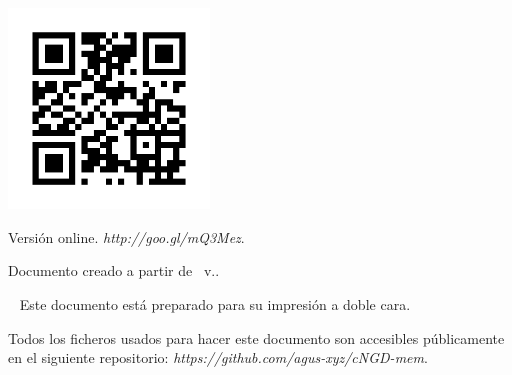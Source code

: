 
\newpage
\thispagestyle{empty}
\mbox{ }

\begin{center}
\includegraphics[width=0.4\textwidth]{Imagenes/Bitmap/Otras/memoriaonline}
\end{center}

\begin{small}
\begin{center}
Versión online. \emph{http://goo.gl/mQ3Mez}.
\end{center}
\end{small}


\vfill%
\begin{small} 
\begin{center}
\ifx\noTeXiSCreditsVal\undefined
  Documento creado a partir de \texis\ v.\texisVer.
\else
\mbox{ }
\fi
\end{center}
\end{small}
\vspace*{1cm}
\begin{small} 
\begin{center}
\ifx\explicacionDobleCaraVal\undefined
\mbox{ }
\else
\noindent Este documento está preparado para su impresión a doble cara.
\fi
\end{center}
\end{small}

\begin{small}
\begin{center}
\vspace*{1cm}
Todos los ficheros usados para hacer este documento son accesibles públicamente en el siguiente repositorio: \emph{https://github.com/agus-xyz/cNGD-mem}.
\end{center}
\end{small}

